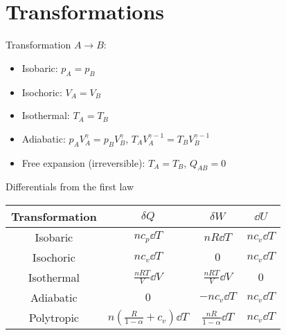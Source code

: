 \documentclass{aa}
\begin{document}
\section{Transformations}
Transformation $A\to B$:
\begin{itemize}
\item Isobaric: $p_A=p_B$\\
\item Isochoric: $V_A=V_B$\\
\item Isothermal: $T_A=T_B$\\
\item Adiabatic: $p_AV_A^\gamma=p_BV_B^\gamma$, $T_AV_A^{\gamma-1}=T_BV_B^{\gamma-1}$\\
\item Free expansion (irreversible): $T_A=T_B$, $Q_{AB}=0$
\end{itemize}
Differentials from the first law
\begin{table}[H]
	\centering
	\begin{tabular}{|c|c|c|c|}
		\hline
		Transformation&$\delta Q$&$\delta W$&$\dd U$\\
		\hline
		Isobaric&$n c_p\dd T$&$nR\dd T$&$nc_v\dd T$\\
		\hline
		Isochoric&$nc_v\dd T$&$0$&$nc_v\dd T$\\
		\hline
		Isothermal&$\frac{nRT}{V}\dd V$&$\frac{nRT}{V}\dd V$&$0$\\
		\hline
		Adiabatic&$0$&$-nc_v\dd T$&$nc_v\dd T$\\
		\hline
		Polytropic&$n\left( \frac{R}{1-\alpha}+c_v \right)\dd T$&$\frac{nR}{1-\alpha}\dd T$&$nc_v\dd T$\\
		\hline
	\end{tabular}
	\label{tab:difftra}
\end{table}
\end{document}
